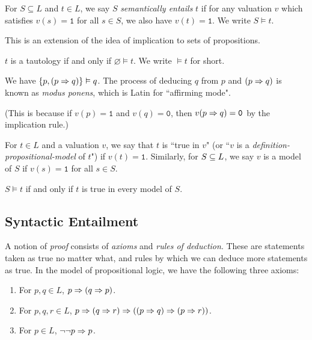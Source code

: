 \documentclass{article}
\begin{document}
\begin{definition}
    For $S \subseteq L$ and $t \in L$, we say $S$ \textit{semantically entails} $t$ if for any valuation $v$ which satisfies $v(s) = \texttt{1}$ for all $s \in S$, we also have $v(t) = \texttt{1}$. We write $S \vDash t$.
    
    This is an extension of the idea of implication to sets of propositions.
\end{definition}

\begin{corollary}
    $t$ is a tautology if and only if $\varnothing \vDash t$. We write $\vDash t$ for short.
\end{corollary}

\begin{example}
    We have $\left\lbrace p, (p \Rightarrow q) \right\rbrace \vDash q$. The process of deducing $q$ from $p$ and $(p \Rightarrow q)$ is known as \textit{modus ponens}, which is Latin for ``affirming mode".
    
    (This is because if $v(p) = \texttt{1}$ and $v(q) = \texttt{0}$, then $v(p \Rightarrow q) = \texttt{0}$ by the implication rule.)
\end{example}

\begin{definition}[Model]
	\label{definition-propositional-model}
    For $t \in L$ and a valuation $v$, we say that $t$ is ``true in $v$" (or ``$v$ is a \textit{definition-propositional-model} of $t$") if $v(t) = \texttt{1}$. Similarly, for $S \subseteq L$, we say $v$ is a model of $S$ if $v(s) = \texttt{1}$ for all $s \in S$.
\end{definition}

\begin{corollary}
    $S \vDash t$ if and only if $t$ is true in every model of $S$.
\end{corollary}


\subsection{Syntactic Entailment}
\label{section-propositional-logic-syntactic-entailment}

A notion of \textit{proof} consists of \textit{axioms} and \textit{rules of deduction}. These are statements taken as true no matter what, and rules by which we can deduce more statements as true. In the model of propositional logic, we have the following three axioms:
\begin{enumerate}
    \item For $p, q \in L$, $p \Rightarrow (q \Rightarrow p)$.
    \item For $p, q, r \in L$, $p \Rightarrow (q \Rightarrow r) \Rightarrow ((p \Rightarrow q) \Rightarrow (p \Rightarrow r))$.
    \item For $p \in L$, $\lnot \lnot p \Rightarrow p$.
\end{enumerate}
\end{document}
